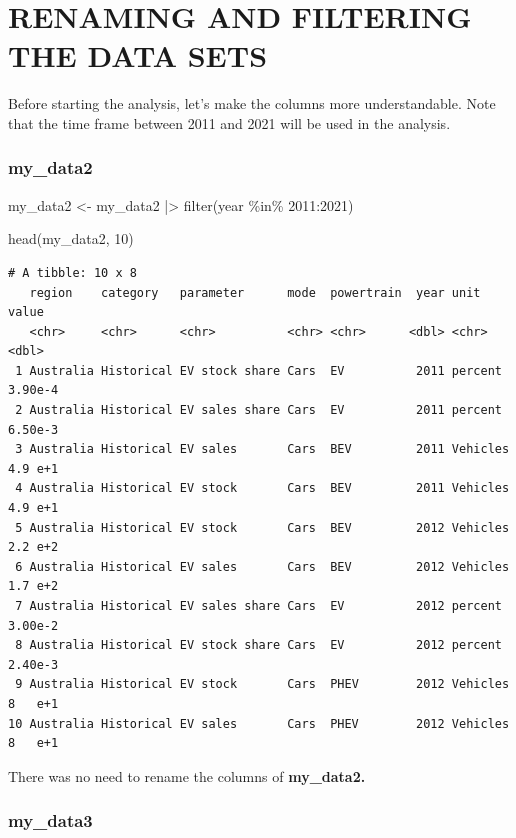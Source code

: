 \documentclass[
  11pt,
  a4paper,
  DIV=11,
  numbers=noendperiod]{scrartcl}
\newenvironment{Shaded}{\begin{snugshade}}{\end{snugshade}}
\newcommand{\DecValTok}[1]{\textcolor[rgb]{0.68,0.00,0.00}{#1}}
\newcommand{\FunctionTok}[1]{\textcolor[rgb]{0.28,0.35,0.67}{#1}}
\newcommand{\NormalTok}[1]{\textcolor[rgb]{0.00,0.23,0.31}{#1}}
\newcommand{\OtherTok}[1]{\textcolor[rgb]{0.00,0.23,0.31}{#1}}
\newcommand{\SpecialCharTok}[1]{\textcolor[rgb]{0.37,0.37,0.37}{#1}}
\begin{document}
\section{RENAMING AND FILTERING THE DATA
SETS}\label{renaming-and-filtering-the-data-sets}

Before starting the analysis, let's make the columns more
understandable. Note that the time frame between 2011 and 2021 will be
used in the analysis.

\subsubsection{my\_data2}\label{my_data2}

\begin{Shaded}
\begin{Highlighting}[]
\NormalTok{my\_data2 }\OtherTok{\textless{}{-}}\NormalTok{ my\_data2 }\SpecialCharTok{|\textgreater{}}
  \FunctionTok{filter}\NormalTok{(year }\SpecialCharTok{\%in\%} \DecValTok{2011}\SpecialCharTok{:}\DecValTok{2021}\NormalTok{)}

\FunctionTok{head}\NormalTok{(my\_data2, }\DecValTok{10}\NormalTok{)}
\end{Highlighting}
\end{Shaded}

\begin{verbatim}
# A tibble: 10 x 8
   region    category   parameter      mode  powertrain  year unit         value
   <chr>     <chr>      <chr>          <chr> <chr>      <dbl> <chr>        <dbl>
 1 Australia Historical EV stock share Cars  EV          2011 percent    3.90e-4
 2 Australia Historical EV sales share Cars  EV          2011 percent    6.50e-3
 3 Australia Historical EV sales       Cars  BEV         2011 Vehicles   4.9 e+1
 4 Australia Historical EV stock       Cars  BEV         2011 Vehicles   4.9 e+1
 5 Australia Historical EV stock       Cars  BEV         2012 Vehicles   2.2 e+2
 6 Australia Historical EV sales       Cars  BEV         2012 Vehicles   1.7 e+2
 7 Australia Historical EV sales share Cars  EV          2012 percent    3.00e-2
 8 Australia Historical EV stock share Cars  EV          2012 percent    2.40e-3
 9 Australia Historical EV stock       Cars  PHEV        2012 Vehicles   8   e+1
10 Australia Historical EV sales       Cars  PHEV        2012 Vehicles   8   e+1
\end{verbatim}

There was no need to rename the columns of \textbf{my\_data2.}

\subsubsection{my\_data3}\label{my_data3}
\end{document}
